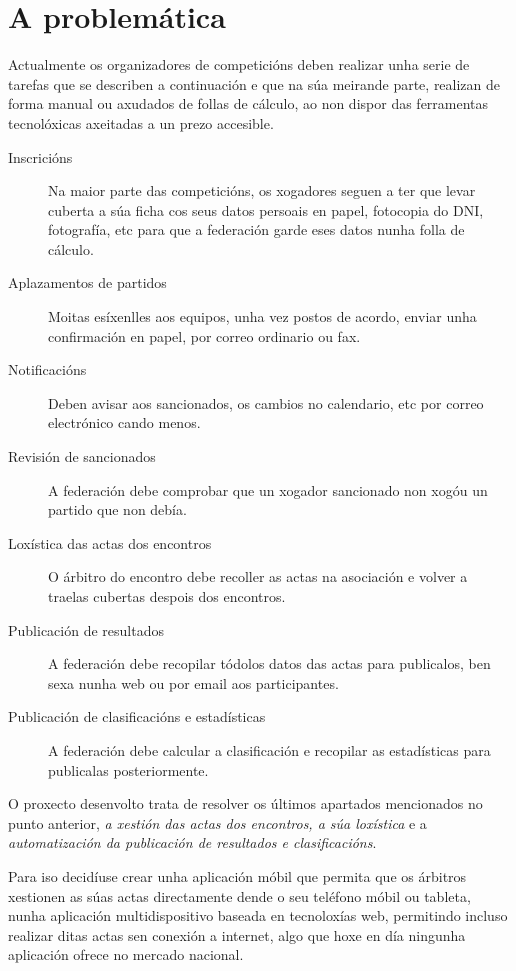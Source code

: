     \section{A problemática}
    Actualmente os organizadores de competicións deben realizar unha serie de tarefas que 
se describen a continuación e que na súa meirande parte, realizan de forma manual ou 
axudados de follas de cálculo, ao non dispor das ferramentas tecnolóxicas axeitadas a un 
prezo accesible.

    \begin{description}
     \item [Inscricións] Na maior parte das competicións, os xogadores seguen a ter que 
levar cuberta a súa ficha cos seus datos persoais en papel, fotocopia do DNI, fotografía, 
etc para que a federación garde eses datos nunha folla de cálculo.
     \item [Aplazamentos de partidos] Moitas esíxenlles aos equipos, unha vez postos de 
acordo, enviar unha confirmación en papel, por correo ordinario ou fax.
     \item [Notificacións] Deben avisar aos sancionados, os cambios no calendario, etc 
por correo electrónico cando menos.
     \item [Revisión de sancionados] A federación debe comprobar que un xogador 
sancionado non xogóu un partido que non debía.
     \item [Loxística das actas dos encontros] O árbitro do encontro debe recoller as 
actas na asociación e volver a traelas cubertas despois dos encontros.
     \item [Publicación de resultados] A federación debe recopilar tódolos datos das 
actas para publicalos, ben sexa nunha web ou por email aos participantes.
     \item [Publicación de clasificacións e estadísticas] A federación debe calcular a 
clasificación e recopilar as estadísticas para publicalas posteriormente.
    \end{description}

    O proxecto desenvolto trata de resolver os últimos apartados mencionados no 
punto anterior, \emph{a xestión das actas dos encontros, a súa loxística} e a 
\emph{automatización da publicación de resultados e clasificacións}.


  Para iso decidíuse crear unha aplicación móbil que permita que os árbitros 
xestionen as súas actas directamente dende o seu teléfono móbil ou tableta, 
nunha aplicación multidispositivo baseada en tecnoloxías web, permitindo incluso realizar 
ditas actas sen conexión a internet, algo que hoxe en día ningunha aplicación ofrece no 
mercado nacional.

